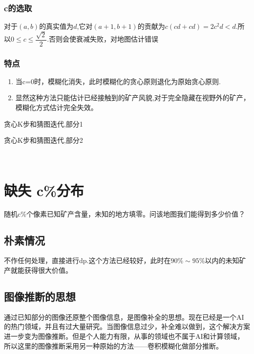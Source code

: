 \documentclass[UTF8]{ctexart}
\begin{document}
\subsubsection{c的选取}
对于$(a,b)$的真实值为$d$,它对$(a+1, b+1)$的贡献为$c(cd+cd)=2c^2d < d$.所以$0\leqslant c\leqslant \dfrac{\sqrt{2}}{2}$.否则会使衰减失败，对地图估计错误
\subsubsection{特点}
\begin{enumerate}[1]
	\item 当c=0时，模糊化消失，此时模糊化的贪心原则退化为原始贪心原则.
	\item 显然这种方法只能估计已经接触到的矿产风貌,对于完全隐藏在视野外的矿产，模糊化方式估计完全失效。
\end{enumerate}
\begin{table}[h]
    \centering
    \caption{贪心K步和猜图迭代,部分1}
\end{table}
\begin{table}[h]
    \centering
    \caption{贪心K步和猜图迭代,部分2}
\end{table}
\newpage
\ \\
\newpage
\section{缺失 c\%分布}
随机c\%个像素已知矿产含量，未知的地方填零。问该地图我们能得到多少价值？
\subsection{朴素情况}
不作任何处理，直接进行dp.这个方法已经较好，此时在$90\%\sim95\%$以内的未知矿产就能获得很大价值。

\subsection{图像推断的思想}
通过已知部分的图像还原整个图像信息，是图像补全的思想。现在已经是一个AI的热门领域，并且有过大量研究。当图像信息过少，补全难以做到，这个解决方案进一步变为图像推断。但是个人能力有限，从事的领域也不属于AI和计算领域，所以这里的图像推断采用另一种原始的方法——卷积模糊化做部分推断。
\end{document}
